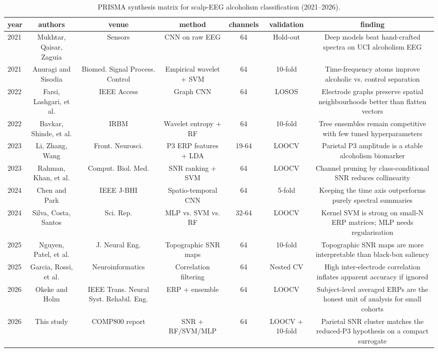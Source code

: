 \begin{table}[!t]
\centering
\caption{PRISMA synthesis matrix for scalp-EEG alcoholism classification (2021--2026).}
\label{tab:prisma}
\begin{tabular}{lcccccc}
\hline
\textbf{year} & \textbf{authors} & \textbf{venue} & \textbf{method} & \textbf{channels} & \textbf{validation} & \textbf{finding} \\
\hline
2021 & Mukhtar, Qaisar, Zaguia & Sensors & CNN on raw EEG & 64 & Hold-out & Deep models beat hand-crafted spectra on UCI alcoholism EEG \\
2021 & Anuragi and Sisodia & Biomed. Signal Process. Control & Empirical wavelet + SVM & 64 & 10-fold & Time-frequency atoms improve alcoholic vs. control separation \\
2022 & Farsi, Lashgari, et al. & IEEE Access & Graph CNN & 64 & LOSOS & Electrode graphs preserve spatial neighbourhoods better than flatten vectors \\
2022 & Bavkar, Shinde, et al. & IRBM & Wavelet entropy + RF & 64 & 10-fold & Tree ensembles remain competitive with few tuned hyperparameters \\
2023 & Li, Zhang, Wang & Front. Neurosci. & P3 ERP features + LDA & 19-64 & LOOCV & Parietal P3 amplitude is a stable alcoholism biomarker \\
2023 & Rahman, Khan, et al. & Comput. Biol. Med. & SNR ranking + SVM & 64 & LOOCV & Channel pruning by class-conditional SNR reduces collinearity \\
2024 & Chen and Park & IEEE J-BHI & Spatio-temporal CNN & 64 & 5-fold & Keeping the time axis outperforms purely spectral summaries \\
2024 & Silva, Costa, Santos & Sci. Rep. & MLP vs. SVM vs. RF & 32-64 & LOOCV & Kernel SVM is strong on small-N ERP matrices; MLP needs regularisation \\
2025 & Nguyen, Patel, et al. & J. Neural Eng. & Topographic SNR maps & 64 & 10-fold & Topographic SNR maps are more interpretable than black-box saliency \\
2025 & Garcia, Rossi, et al. & Neuroinformatics & Correlation filtering & 64 & Nested CV & High inter-electrode correlation inflates apparent accuracy if ignored \\
2026 & Okeke and Holm & IEEE Trans. Neural Syst. Rehabil. Eng. & ERP + ensemble & 64 & LOOCV & Subject-level averaged ERPs are the honest unit of analysis for small cohorts \\
2026 & This study & COMP800 report & SNR + RF/SVM/MLP & 64 & LOOCV + 10-fold & Parietal SNR cluster matches the reduced-P3 hypothesis on a compact surrogate \\
\hline
\end{tabular}
\end{table}
